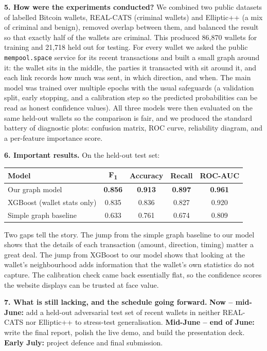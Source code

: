\documentclass[11pt]{article}
\begin{document}
\noindent\textbf{5. How were the experiments conducted?}\quad
We combined two public datasets of labelled Bitcoin wallets, REAL-CATS (criminal wallets) and
Elliptic++ (a mix of criminal and benign), removed overlap between them, and balanced the result
so that exactly half of the wallets are criminal. This produced 86{,}870 wallets for training
and 21{,}718 held out for testing. For every wallet we asked the public \texttt{mempool.space}
service for its recent transactions and built a small graph around it: the wallet sits in the
middle, the parties it transacted with sit around it, and each link records how much was sent,
in which direction, and when. The main model was trained over multiple epochs with the usual
safeguards (a validation split, early stopping, and a calibration step so the predicted
probabilities can be read as honest confidence values). All three models were then evaluated on
the same held-out wallets so the comparison is fair, and we produced the standard battery of
diagnostic plots: confusion matrix, ROC curve, reliability diagram, and a per-feature importance
score.

\noindent\textbf{6. Important results.}\quad
On the held-out test set:

\vspace{-0.2em}
\begin{center}
\small
\begin{tabular}{lcccc}
\toprule
\textbf{Model} & \textbf{F\textsubscript{1}} & \textbf{Accuracy} & \textbf{Recall} & \textbf{ROC-AUC} \\
\midrule
Our graph model & \textbf{0.856} & \textbf{0.913} & \textbf{0.897} & \textbf{0.961} \\
XGBoost (wallet stats only) & 0.835 & 0.836 & 0.827 & 0.920 \\
Simple graph baseline & 0.633 & 0.761 & 0.674 & 0.809 \\
\bottomrule
\end{tabular}
\end{center}
\vspace{-0.2em}

Two gaps tell the story. The jump from the simple graph baseline to our model shows that the
details of each transaction (amount, direction, timing) matter a great deal. The jump from
XGBoost to our model shows that looking at the wallet's neighbourhood adds information that the
wallet's own statistics do not capture. The calibration check came back essentially flat, so the
confidence scores the website displays can be trusted at face value.

\noindent\textbf{7. What is still lacking, and the schedule going forward.}\quad
\textbf{Now -- mid-June:} add a held-out adversarial test set of recent wallets in neither
REAL-CATS nor Elliptic++ to stress-test generalisation.
\textbf{Mid-June -- end of June:} write the final report, polish the live demo, and build the
presentation deck. \textbf{Early July:} project defence and final submission.
\end{document}
